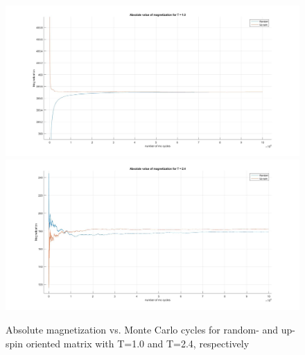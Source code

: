 \documentclass[10pt,a4paper]{article}
\begin{document}
\begin{figure}[H]
\centerline{
\includegraphics[scale=0.15]{absmag1T}
\includegraphics[scale=0.15]{absmag24T}
}
\caption{Absolute magnetization vs. Monte Carlo cycles for random- and up-spin oriented matrix with T=1.0 and T=2.4, respectively}
\label{fig:absmagn}
\end{figure}
\end{document}
